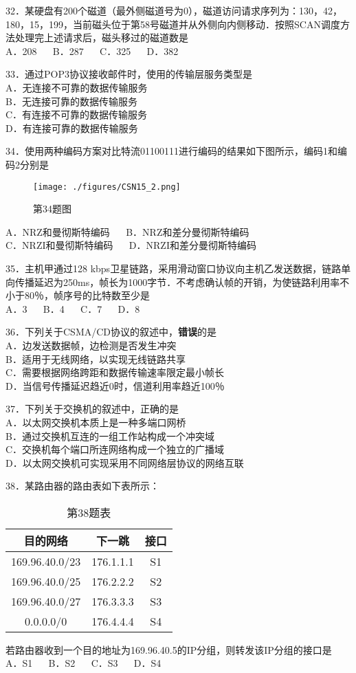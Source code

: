 32．某硬盘有200个磁道（最外侧磁道号为0），磁道访问请求序列为：130，42，180，15，199，当前磁头位于第58号磁道并从外侧向内侧移动．按照SCAN调度方法处理完上述请求后，磁头移过的磁道数是 \\
A．208 $\quad$ B．287 $\quad$ C．325 $\quad$ D．382

33．通过POP3协议接收邮件时，使用的传输层服务类型是 \\
A．无连接不可靠的数据传输服务 \\
B．无连接可靠的数据传输服务 \\
C．有连接不可靠的数据传输服务 \\
D．有连接可靠的数据传输服务

34．使用两种编码方案对比特流01100111进行编码的结果如下图所示，编码1和编码2分别是
\begin{figure}[ht]
\centering
\texttt{[image: ./figures/CSN15\_2.png]}
\caption{第34题图} \label{CSN15_fig2}
\end{figure}
A．NRZ和曼彻斯特编码 $\quad$ B．NRZ和差分曼彻斯特编码 \\
C．NRZI和曼彻斯特编码 $\quad$ D．NRZI和差分曼彻斯特编码

35．主机甲通过128 kbps卫星链路，采用滑动窗口协议向主机乙发送数据，链路单向传播延迟为250ms，帧长为1000字节．不考虑确认帧的开销，为使链路利用率不小于80％，帧序号的比特数至少是 \\
A．3 $\quad$ B．4 $\quad$ C．7 $\quad$ D．8

36．下列关于CSMA/CD协议的叙述中，\textbf{错误}的是 \\
A．边发送数据帧，边检测是否发生冲突 \\
B．适用于无线网络，以实现无线链路共享 \\
C．需要根据网络跨距和数据传输速率限定最小帧长 \\
D．当信号传播延迟趋近0时，信道利用率趋近100％

37．下列关于交换机的叙述中，正确的是 \\
A．以太网交换机本质上是一种多端口网桥 \\
B．通过交换机互连的一组工作站构成一个冲突域 \\
C．交换机每个端口所连网络构成一个独立的广播域 \\
D．以太网交换机可实现采用不同网络层协议的网络互联

38．某路由器的路由表如下表所示：
\begin{table}[ht]
\centering
\caption{第38题表}\label{CSN15_tab1}
\begin{tabular}{|c|c|c|}
\hline
目的网络 & 下一跳 & 接口 \\
\hline
169.96.40.0/23 & 176.1.1.1 & S1 \\
\hline
169.96.40.0/25 & 176.2.2.2 & S2 \\
\hline
169.96.40.0/27 & 176.3.3.3 & S3 \\
\hline
0.0.0.0/0 & 176.4.4.4 & S4 \\
\hline
\end{tabular}
\end{table}
若路由器收到一个目的地址为169.96.40.5的IP分组，则转发该IP分组的接口是 \\
A．S1 $\quad$ B．S2 $\quad$ C．S3 $\quad$ D．S4

